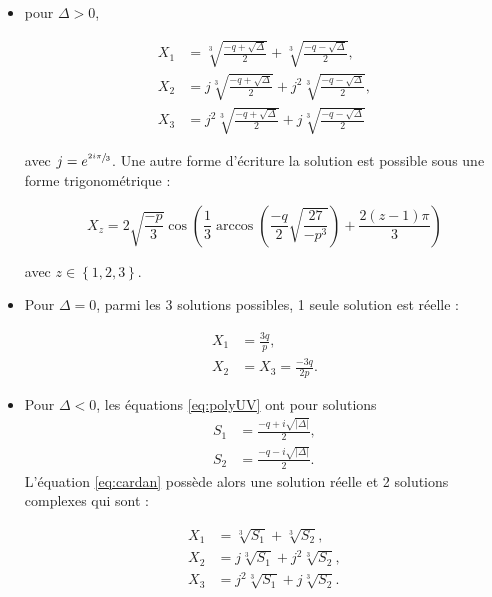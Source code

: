 \begin{itemize}
\item pour $\Delta >0$, 

\begin{subequations}
\begin{align}
X_1 &= \sqrt[3]{\frac{-q+\sqrt{\Delta}}{2}}+\sqrt[3]{\frac{-q-\sqrt{\Delta}}{2}},\\
X_2 &= j\sqrt[3]{\frac{-q+\sqrt{\Delta}}{2}}+j^2\sqrt[3]{\frac{-q-\sqrt{\Delta}}{2}},\\
X_3 &= j^2\sqrt[3]{\frac{-q+\sqrt{\Delta}}{2}}+j\sqrt[3]{\frac{-q-\sqrt{\Delta}}{2}}
\end{align}
\end{subequations}

avec $j = e^{\sfrac{2i\pi}{3}}$. Une autre forme d'écriture la solution est possible sous une forme trigonométrique : 

\begin{equation}
X_{z} = 2\sqrt{\frac{-p}{3}} \cos \left(\frac{1}{3} \arccos\left(\frac{-q}{2}\sqrt{\frac{27}{-p^3}}\right) + \frac{2(z-1)\pi}{3}\right)
\end{equation}

avec $z \in \left\lbrace 1,2,3 \right\rbrace$.


\item Pour $\Delta = 0$, parmi les 3 solutions possibles, 1 seule solution est réelle : 

\begin{subequations}
\begin{align}
X_1 &= \frac{3q}{p},\\
X_2 &= X_3 = \frac{-3q}{2p}.
\end{align}
\end{subequations}

\item Pour $\Delta < 0$, les équations \ref{eq:polyUV} ont pour solutions 
\begin{align}
S_1 &= \frac{-q+i\sqrt{\vert\Delta \vert}}{2},\\
S_2 &= \frac{-q-i\sqrt{\vert \Delta \vert}}{2}. 
\end{align} 
L'équation \ref{eq:cardan} possède alors une solution réelle et 2 solutions complexes qui sont 
: 

\begin{subequations}
\begin{align}
X_1 &= \sqrt[3]{S_1}+\sqrt[3]{S_2},\\
X_2 &= j\sqrt[3]{S_1}+j^2\sqrt[3]{S_2},\\
X_3 &= j^2\sqrt[3]{S_1}+j\sqrt[3]{S_2}.
\end{align}
\end{subequations}
\end{itemize}

